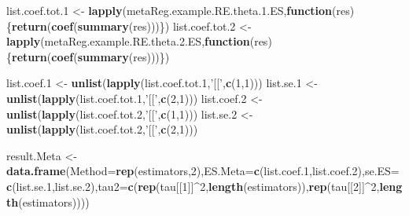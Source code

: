 \documentclass[]{book}
\newenvironment{Shaded}{\begin{snugshade}}{\end{snugshade}}
\newcommand{\ControlFlowTok}[1]{\textcolor[rgb]{0.13,0.29,0.53}{\textbf{#1}}}
\newcommand{\DataTypeTok}[1]{\textcolor[rgb]{0.13,0.29,0.53}{#1}}
\newcommand{\DecValTok}[1]{\textcolor[rgb]{0.00,0.00,0.81}{#1}}
\newcommand{\FloatTok}[1]{\textcolor[rgb]{0.00,0.00,0.81}{#1}}
\newcommand{\KeywordTok}[1]{\textcolor[rgb]{0.13,0.29,0.53}{\textbf{#1}}}
\newcommand{\NormalTok}[1]{#1}
\newcommand{\OperatorTok}[1]{\textcolor[rgb]{0.81,0.36,0.00}{\textbf{#1}}}
\newcommand{\StringTok}[1]{\textcolor[rgb]{0.31,0.60,0.02}{#1}}
\theoremstyle{definition}
\theoremstyle{definition}
\theoremstyle{definition}
\theoremstyle{remark}
\begin{document}
\begin{Shaded}
\begin{Highlighting}[]
\NormalTok{list.coef.tot}\FloatTok{.1}\NormalTok{ <-}\StringTok{ }\KeywordTok{lapply}\NormalTok{(metaReg.example.RE.theta.}\FloatTok{1.}\NormalTok{ES,}\ControlFlowTok{function}\NormalTok{(res)\{}\KeywordTok{return}\NormalTok{(}\KeywordTok{coef}\NormalTok{(}\KeywordTok{summary}\NormalTok{(res)))\})}
\NormalTok{list.coef.tot}\FloatTok{.2}\NormalTok{ <-}\StringTok{ }\KeywordTok{lapply}\NormalTok{(metaReg.example.RE.theta.}\FloatTok{2.}\NormalTok{ES,}\ControlFlowTok{function}\NormalTok{(res)\{}\KeywordTok{return}\NormalTok{(}\KeywordTok{coef}\NormalTok{(}\KeywordTok{summary}\NormalTok{(res)))\})}

\NormalTok{list.coef}\FloatTok{.1}\NormalTok{ <-}\StringTok{ }\KeywordTok{unlist}\NormalTok{(}\KeywordTok{lapply}\NormalTok{(list.coef.tot}\FloatTok{.1}\NormalTok{,}\StringTok{'[['}\NormalTok{,}\KeywordTok{c}\NormalTok{(}\DecValTok{1}\NormalTok{,}\DecValTok{1}\NormalTok{)))}
\NormalTok{list.se}\FloatTok{.1}\NormalTok{ <-}\StringTok{ }\KeywordTok{unlist}\NormalTok{(}\KeywordTok{lapply}\NormalTok{(list.coef.tot}\FloatTok{.1}\NormalTok{,}\StringTok{'[['}\NormalTok{,}\KeywordTok{c}\NormalTok{(}\DecValTok{2}\NormalTok{,}\DecValTok{1}\NormalTok{)))}
\NormalTok{list.coef}\FloatTok{.2}\NormalTok{ <-}\StringTok{ }\KeywordTok{unlist}\NormalTok{(}\KeywordTok{lapply}\NormalTok{(list.coef.tot}\FloatTok{.2}\NormalTok{,}\StringTok{'[['}\NormalTok{,}\KeywordTok{c}\NormalTok{(}\DecValTok{1}\NormalTok{,}\DecValTok{1}\NormalTok{)))}
\NormalTok{list.se}\FloatTok{.2}\NormalTok{ <-}\StringTok{ }\KeywordTok{unlist}\NormalTok{(}\KeywordTok{lapply}\NormalTok{(list.coef.tot}\FloatTok{.2}\NormalTok{,}\StringTok{'[['}\NormalTok{,}\KeywordTok{c}\NormalTok{(}\DecValTok{2}\NormalTok{,}\DecValTok{1}\NormalTok{)))}

\NormalTok{result.Meta <-}\StringTok{ }\KeywordTok{data.frame}\NormalTok{(}\DataTypeTok{Method=}\KeywordTok{rep}\NormalTok{(estimators,}\DecValTok{2}\NormalTok{),}\DataTypeTok{ES.Meta=}\KeywordTok{c}\NormalTok{(list.coef}\FloatTok{.1}\NormalTok{,list.coef}\FloatTok{.2}\NormalTok{),}\DataTypeTok{se.ES=}\KeywordTok{c}\NormalTok{(list.se}\FloatTok{.1}\NormalTok{,list.se}\FloatTok{.2}\NormalTok{),}\DataTypeTok{tau2=}\KeywordTok{c}\NormalTok{(}\KeywordTok{rep}\NormalTok{(tau[[}\DecValTok{1}\NormalTok{]]}\OperatorTok{^}\DecValTok{2}\NormalTok{,}\KeywordTok{length}\NormalTok{(estimators)),}\KeywordTok{rep}\NormalTok{(tau[[}\DecValTok{2}\NormalTok{]]}\OperatorTok{^}\DecValTok{2}\NormalTok{,}\KeywordTok{length}\NormalTok{(estimators))))}


\end{Highlighting}
\end{Shaded}
\end{document}
